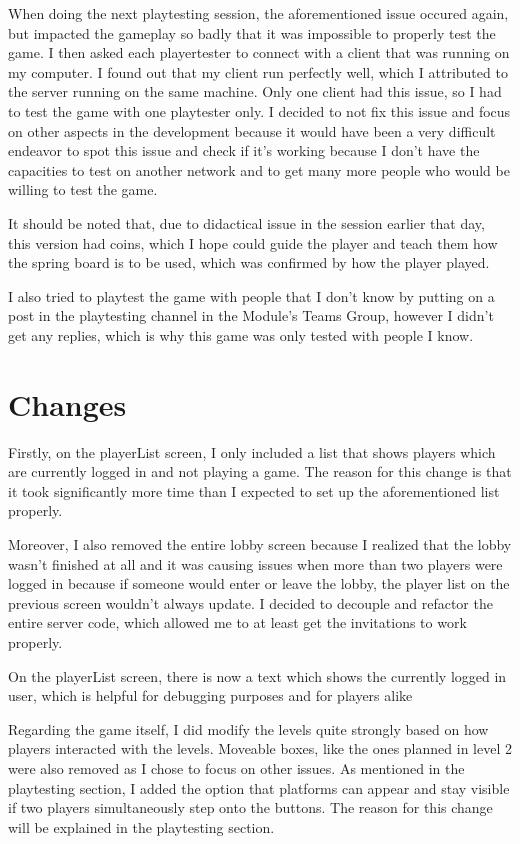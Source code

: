 \documentclass{article}
\begin{document}
\bigskip
When doing the next playtesting session, the aforementioned issue occured again, but impacted the gameplay so badly that it was impossible to properly test the game. I then asked each playertester to connect with a client that was running on my computer. I found out that my client run perfectly well, which I attributed to the server running on the same machine. Only one client had this issue, so I had to test the game with one playtester only. I decided to not fix this issue and focus on other aspects in the development because it would have been a very difficult endeavor to spot this issue and check if it's working because I don't have the capacities to test on another network and to get many more people who would be willing to test the game.

It should be noted that, due to didactical issue in the session earlier that day, this version had coins, which I hope could guide the player and teach them how the spring board is to be used, which was confirmed by how the player played.

\bigskip
I also tried to playtest the game with people that I don't know by putting on a post in the playtesting channel in the Module's Teams Group, however I didn't get any replies, which is why this game was only tested with people I know.


\section{Changes}
Firstly, on the playerList screen, I only included a list that shows players which are currently logged in and not playing a game. The reason for this change is that it took significantly more time than I expected to set up the aforementioned list properly. 

\bigskip
Moreover, I also removed the entire lobby screen because I realized that the lobby wasn't finished at all and it was causing issues when more than two players were logged in because if someone would enter or leave the lobby, the player list on the previous screen wouldn't always update. I decided to decouple and refactor the entire server code, which allowed me to at least get the invitations to work properly. 

\bigskip
On the playerList screen, there is now a text which shows the currently logged in user, which is helpful for debugging purposes and for players alike

\bigskip
Regarding the game itself, I did modify the levels quite strongly based on how players interacted with the levels. Moveable boxes, like the ones planned in level 2 were also removed as I chose to focus on other issues. As mentioned in the playtesting section, I added the option that platforms can appear and stay visible if two players simultaneously step onto the buttons. The reason for this change will be explained in the playtesting section.
\end{document}
